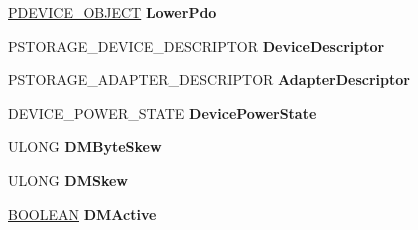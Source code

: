\begin{DoxyCompactItemize}
\begin{tabbing}
\end{tabbing}\item 
\mbox{\label{struct___f_u_n_c_t_i_o_n_a_l___d_e_v_i_c_e___e_x_t_e_n_s_i_o_n_a37eec9d9cccc83666b90b74f2ffab9e7}} 
\hyperlink{struct___d_e_v_i_c_e___o_b_j_e_c_t}{P\+D\+E\+V\+I\+C\+E\+\_\+\+O\+B\+J\+E\+CT} {\bfseries Lower\+Pdo}
\item 
\mbox{\label{struct___f_u_n_c_t_i_o_n_a_l___d_e_v_i_c_e___e_x_t_e_n_s_i_o_n_ae8a6b5e50e129d86bff14fd26c508e70}} 
P\+S\+T\+O\+R\+A\+G\+E\+\_\+\+D\+E\+V\+I\+C\+E\+\_\+\+D\+E\+S\+C\+R\+I\+P\+T\+OR {\bfseries Device\+Descriptor}
\item 
\mbox{\label{struct___f_u_n_c_t_i_o_n_a_l___d_e_v_i_c_e___e_x_t_e_n_s_i_o_n_aa75c5460971a3e9c3d83bf58986d67be}} 
P\+S\+T\+O\+R\+A\+G\+E\+\_\+\+A\+D\+A\+P\+T\+E\+R\+\_\+\+D\+E\+S\+C\+R\+I\+P\+T\+OR {\bfseries Adapter\+Descriptor}
\item 
\mbox{\label{struct___f_u_n_c_t_i_o_n_a_l___d_e_v_i_c_e___e_x_t_e_n_s_i_o_n_ab20ad01885e76bb5319760c893b62841}} 
D\+E\+V\+I\+C\+E\+\_\+\+P\+O\+W\+E\+R\+\_\+\+S\+T\+A\+TE {\bfseries Device\+Power\+State}
\item 
\mbox{\label{struct___f_u_n_c_t_i_o_n_a_l___d_e_v_i_c_e___e_x_t_e_n_s_i_o_n_a183aba64a152512db725542fb2836156}} 
U\+L\+O\+NG {\bfseries D\+M\+Byte\+Skew}
\item 
\mbox{\label{struct___f_u_n_c_t_i_o_n_a_l___d_e_v_i_c_e___e_x_t_e_n_s_i_o_n_af0afdcf1e3e2f442a991bd48e58f9a3c}} 
U\+L\+O\+NG {\bfseries D\+M\+Skew}
\item 
\mbox{\label{struct___f_u_n_c_t_i_o_n_a_l___d_e_v_i_c_e___e_x_t_e_n_s_i_o_n_acad97b411535269c0c168b6913821a90}} 
\hyperlink{_processor_bind_8h_a112e3146cb38b6ee95e64d85842e380a}{B\+O\+O\+L\+E\+AN} {\bfseries D\+M\+Active}
\item 

\end{DoxyCompactItemize}
